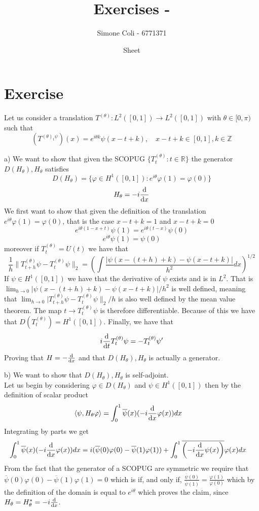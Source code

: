 \documentclass{article}
\title{Exercises - }
\author{Simone Coli - 6771371}
\date{Sheet }
\newcommand{\R}{\mathbb{R}}
\begin{document}
\maketitle

\section{Exercise}
Let us consider a translation $T^{(\theta)} : L^2 ([0,1]) \to L^2([0,1])$ with $\theta \in [0, \pi)$ such that
\[
    (T^{(\theta)_t \psi}) (x) = e^{i\theta k} \psi(x-t+k), \quad x-t+k \in [0,1], k\in \mathbb Z
\]

a) We want to show that given the SCOPUG $\{ T_t^{(\theta)}:t \in \R \}$ the generator $D(H_\theta), H_\theta$ satisfies
\[
    D(H_\theta) = \{ \varphi \in H^1([0,1]): e^{i\theta} \varphi(1) = \varphi(0) \}
\]
\[
    H_\theta = -i \odv{}{x}
\]
We first want to show that given the definition of the translation $e^{i\theta} \varphi(1) = \varphi(0)$, that is the case $x-t+k = 1$ and $x-t+k = 0$
\[
    e^{i\theta (1-x+t)} \psi(1) = e^{i\theta (t-x)} \psi(0)
\]
\[
    e^{i\theta} \psi(1) = \psi(0)
\]
moreover if $T_t^{(\theta)} = U(t)$ we have that
\[
    \frac{1}{h} \| T_{t+h}^{(\theta)}\psi - T_t^{(\theta)} \psi \|_2 = \left( \int \frac{|\psi(x-(t+h) +k) - \psi(x-t+k)|}{h^2} dx \right)^{1/2}
\]
If $\psi  \in H^1([0,1])$ we have that the derivative of $\psi$ exists and is in $L^2$. That is $\lim_{h\to0}|\psi(x-(t+h) +k) - \psi(x-t+k)|/h^2$ is well defined, meaning that $\lim_{h \to 0} | T_{t+h}^{(\theta)}\psi - T_t^{(\theta)} \psi \|_2 / h$ is also well defined by the mean value theorem. The map $t \to T_t^{(\theta)} \psi$ is therefore differentiable. Because of this we have that $D(T_t^{(\theta)}) = H^1([0,1])$. Finally, we have that 
\[
    i \odv{}{t}T_t^{(\theta)} \psi = - T_t^{(\theta)} \psi'
\]
Proving that $H = - \odv{}{x}$ and that $D(H_\theta), H_\theta$ is actually a generator.

b) We want to show that $D(H_\theta), H_\theta$ is self-adjoint.\\
Let us begin by considering $\varphi \in D(H_\theta)$ and $\psi \in H^1([0,1])$ then by the definition of scalar product
\[
    \begin{split}
        \langle \psi, H_\theta \varphi \rangle & = \int_0^1 \overline{\psi}(x) (-i\odv{}{x} \varphi(x)) dx
    \end{split}
\]
Integrating by parts we get
\[
    \begin{split}
        \int_0^1 \overline{\psi}(x) (-i\odv{}{x} \varphi(x)) dx & = i (\overline{\psi}(0) \varphi (0) - \overline{\psi}(1) \varphi(1)) + \int_0^1 \overline{\left(-i\odv{}{x} \psi (x)\right)} \varphi(x) dx
    \end{split}
\]
From the fact that the generator of a SCOPUG are symmetric we require that $\overline{\psi}(0) \varphi (0) - \overline{\psi}(1) \varphi(1) = 0$ which is if, and only if, $\frac{\overline{\psi}(0)}{\overline{\psi} (1)} = \frac{\varphi(1)}{\varphi(0)}$ which by the definition of the domain is equal to $e^{i\theta}$ which proves the claim, since $H_\theta = H^*_\theta= -i \odv{}{x} $.
\end{document}

